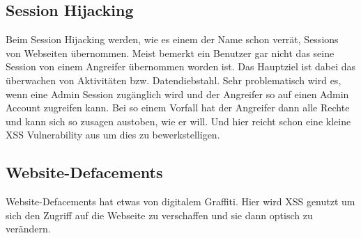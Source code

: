 \subsection{Session Hijacking}
\label{sec:xss_session_hijacking}
Beim Session Hijacking werden, wie es einem der Name schon verrät, Sessions von Webseiten übernommen. Meist bemerkt ein Benutzer gar nicht das seine Session von einem Angreifer übernommen worden ist. Das Hauptziel ist dabei das überwachen von Aktivitäten bzw. Datendiebstahl. Sehr problematisch wird es, wenn eine Admin Session zugänglich wird und der Angreifer so auf einen Admin Account zugreifen kann. Bei so einem Vorfall hat der Angreifer dann alle Rechte und kann sich so zusagen austoben, wie er will. Und hier reicht schon eine kleine XSS Vulnerability aus um dies zu bewerkstelligen. 
\subsection{Website-Defacements}
\label{sec:xss_web_def}
Website-Defacements hat etwas von digitalem Graffiti. Hier wird XSS genutzt um sich den Zugriff auf die Webseite zu verschaffen und sie dann optisch zu verändern. 
